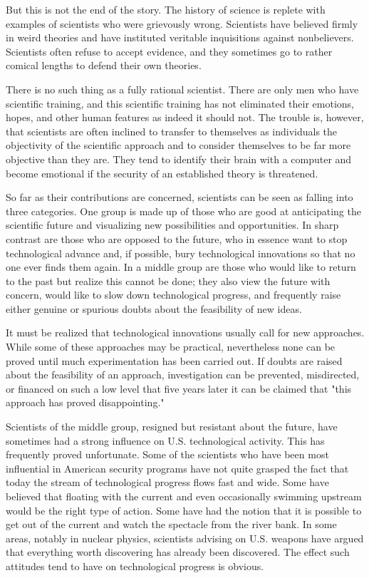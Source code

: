 But this is not the end of the story. The history of science is replete with examples of scientists who were grievously wrong. Scientists have believed firmly in weird theories and have instituted veritable inquisitions against nonbelievers. Scientists often refuse to accept evidence, and they sometimes go to rather comical lengths to defend their own theories.

There is no such thing as a fully rational scientist. There are only men who have scientific training, and this scientific training has not eliminated their emotions, hopes, and other human features as indeed it should not. The trouble is, however, that scientists are often inclined to transfer to themselves as individuals the objectivity of the scientific approach and to consider themselves to be far more objective than they are. They tend to identify their brain with a computer and become emotional if the security of an established theory is threatened.

So far as their contributions are concerned, scientists can be seen as falling into three categories. One group is made up of those who are good at anticipating the scientific future and visualizing new possibilities and opportunities. In sharp contrast are those who are opposed to the future, who in essence want to stop technological advance and, if possible, bury technological innovations so that no one ever finds them again. In a middle group are those who would like to return to the past but realize this cannot be done; they also view the future with concern, would like to slow down technological progress, and frequently raise either genuine or spurious doubts about the feasibility of new ideas.

It must be realized that technological innovations usually call for new approaches. While some of these approaches may be practical, nevertheless none can be proved until much experimentation has been carried out. If doubts are raised about the feasibility of an approach, investigation can be prevented, misdirected, or financed on such a low level that five years later it can be claimed that "this approach has proved disappointing."

Scientists of the middle group, resigned but resistant about the future, have sometimes had a strong influence on U.S. technological activity. This has frequently proved unfortunate. Some of the scientists who have been most influential in American security programs have not quite grasped the fact that today the stream of technological progress flows fast and wide. Some have believed that floating with the current and even occasionally swimming upstream would be the right type of action. Some have had the notion that it is possible to get out of the current and watch the spectacle from the river bank. In some areas, notably in nuclear physics, scientists advising on U.S. weapons have argued that everything worth discovering has already been discovered. The effect such attitudes tend to have on technological progress is obvious.

